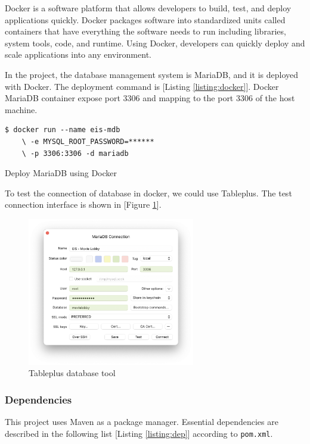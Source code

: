 \documentclass{article}
\begin{document}
Docker is a software platform that allows developers to build, test, and deploy applications quickly. Docker packages software into standardized units called containers that have everything the software needs to run including libraries, system tools, code, and runtime. Using Docker, developers can quickly deploy and scale applications into any environment.
\cite{docker}

In the project, the database management system is MariaDB, and it is deployed with Docker. The deployment command is [Listing \ref{listing:docker}]. Docker MariaDB container expose port 3306 and mapping to the port 3306 of the host machine.

\begin{listing}[!htp]
\begin{verbatim}
$ docker run --name eis-mdb
    \ -e MYSQL_ROOT_PASSWORD=******
    \ -p 3306:3306 -d mariadb
\end{verbatim}
\caption{Deploy MariaDB using Docker}
\label{listing:docker}
\end{listing}

To test the connection of database in docker, we could use Tableplus. The test connection interface is shown in [Figure \ref{fig:tableplus}].

\begin{figure}[!htp]
\centering
\includegraphics[width=0.65\textwidth]{tableplus.png}
\caption{\label{fig:tableplus}Tableplus database tool}
\end{figure}

\subsubsection{Dependencies}

This project uses Maven as a package manager. Essential dependencies are described in the following list [Listing \ref{listing:dep}] according to \verb|pom.xml|.
\end{document}
